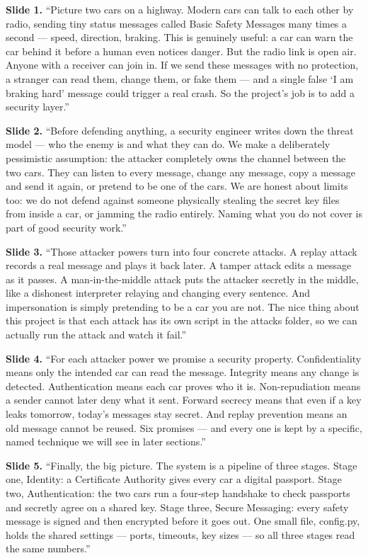 \documentclass[11pt,a4paper]{article}
\begin{document}
\textbf{Slide 1.} ``Picture two cars on a highway. Modern cars can talk to each
other by radio, sending tiny status messages called Basic Safety Messages many
times a second --- speed, direction, braking. This is genuinely useful: a car
can warn the car behind it before a human even notices danger. But the radio
link is open air. Anyone with a receiver can join in. If we send these messages
with no protection, a stranger can read them, change them, or fake them --- and
a single false `I am braking hard' message could trigger a real crash. So the
project's job is to add a security layer.''

\textbf{Slide 2.} ``Before defending anything, a security engineer writes down
the threat model --- who the enemy is and what they can do. We make a deliberately
pessimistic assumption: the attacker completely owns the channel between the two
cars. They can listen to every message, change any message, copy a message and
send it again, or pretend to be one of the cars. We are honest about limits too:
we do not defend against someone physically stealing the secret key files from
inside a car, or jamming the radio entirely. Naming what you do not cover is part
of good security work.''

\textbf{Slide 3.} ``Those attacker powers turn into four concrete attacks. A
replay attack records a real message and plays it back later. A tamper attack
edits a message as it passes. A man-in-the-middle attack puts the attacker
secretly in the middle, like a dishonest interpreter relaying and changing every
sentence. And impersonation is simply pretending to be a car you are not. The
nice thing about this project is that each attack has its own script in the
attacks folder, so we can actually run the attack and watch it fail.''

\textbf{Slide 4.} ``For each attacker power we promise a security property.
Confidentiality means only the intended car can read the message. Integrity
means any change is detected. Authentication means each car proves who it is.
Non-repudiation means a sender cannot later deny what it sent. Forward secrecy
means that even if a key leaks tomorrow, today's messages stay secret. And replay
prevention means an old message cannot be reused. Six promises --- and every one
is kept by a specific, named technique we will see in later sections.''

\textbf{Slide 5.} ``Finally, the big picture. The system is a pipeline of three
stages. Stage one, Identity: a Certificate Authority gives every car a digital
passport. Stage two, Authentication: the two cars run a four-step handshake to
check passports and secretly agree on a shared key. Stage three, Secure
Messaging: every safety message is signed and then encrypted before it goes out.
One small file, config.py, holds the shared settings --- ports, timeouts, key
sizes --- so all three stages read the same numbers.''
\end{document}
